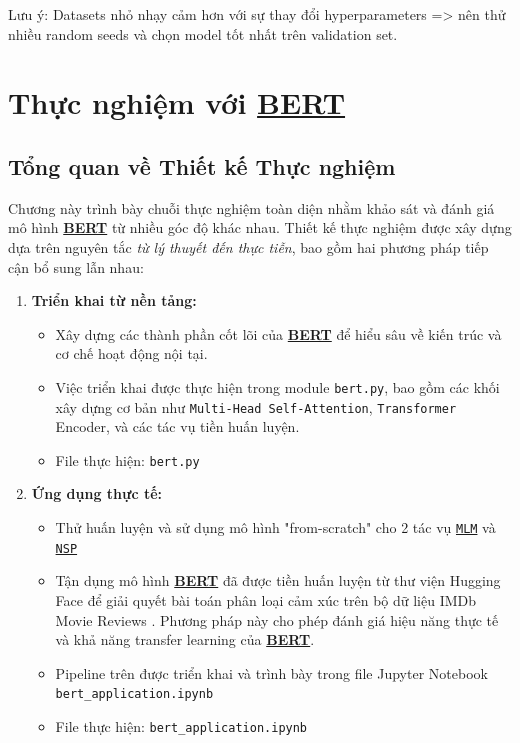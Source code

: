 Lưu ý: Datasets nhỏ nhạy cảm hơn với sự thay đổi hyperparameters => nên thử nhiều random seeds và chọn model tốt nhất trên validation set.


\section{Thực nghiệm với \hyperref[acro:bert]{\textbf{BERT}}}
\label{sec:thuc_nghiem_bert}

\subsection{Tổng quan về Thiết kế Thực nghiệm}
\label{ssec:tong_quan_thiet_ke_thuc_nghiem}

Chương này trình bày chuỗi thực nghiệm toàn diện nhằm khảo sát và đánh giá mô hình \hyperref[acro:bert]{\textbf{BERT}} từ nhiều góc độ khác nhau. Thiết kế thực nghiệm được xây dựng dựa trên nguyên tắc \textit{từ lý thuyết đến thực tiễn}, bao gồm hai phương pháp tiếp cận bổ sung lẫn nhau:

\begin{enumerate}
    \item \textbf{Triển khai từ nền tảng:} 
    \begin{itemize}
        \item Xây dựng các thành phần cốt lõi của \hyperref[acro:bert]{\textbf{BERT}} để hiểu sâu về kiến trúc và cơ chế hoạt động nội tại. 
        \item Việc triển khai được thực hiện trong module \texttt{bert.py}, bao gồm các khối xây dựng cơ bản như \texttt{Multi-Head Self-Attention}, \texttt{Transformer} Encoder, và các tác vụ tiền huấn luyện.
        \item File thực hiện: \texttt{bert.py}
    \end{itemize}
    
    \item \textbf{Ứng dụng thực tế:} 
    \begin{itemize}
        \item Thử huấn luyện và sử dụng mô hình "from-scratch" cho 2 tác vụ \hyperref[acro:mlm]{\texttt{MLM}} và \hyperref[acro:nsp]{\texttt{NSP}}
        \item Tận dụng mô hình \hyperref[acro:bert]{\textbf{BERT}} đã được tiền huấn luyện từ thư viện Hugging Face \cite{wolf2019huggingface} để giải quyết bài toán phân loại cảm xúc trên bộ dữ liệu IMDb Movie Reviews \cite{maas2011learning}. Phương pháp này cho phép đánh giá hiệu năng thực tế và khả năng transfer learning của \hyperref[acro:bert]{\textbf{BERT}}.
        \item Pipeline trên được triển khai và trình bày trong file Jupyter Notebook \texttt{bert\_application.ipynb}
        \item File thực hiện: \texttt{bert\_application.ipynb}
    \end{itemize}
\end{enumerate}

